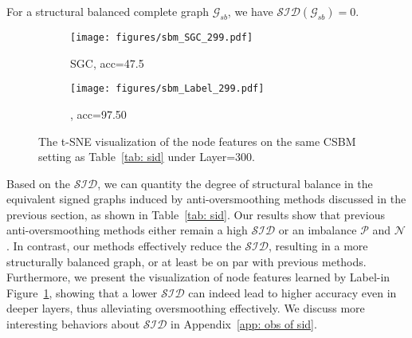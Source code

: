 \begin{proposition}
\label{pro: sid}
For a structural balanced complete graph $\mathcal{G}_{sb}$, we have $\mathcal{SID}(\mathcal{G}_{sb})=0$.
\end{proposition}
% 
\begin{figure}[t]
    \centering
    \begin{subfigure}{0.3\textwidth}
      \texttt{[image: figures/sbm\_SGC\_299.pdf]}
      \caption{SGC, acc=47.5}
    \end{subfigure}
    \quad
    \begin{subfigure}{0.3\textwidth}
      \texttt{[image: figures/sbm\_Label\_299.pdf]}
      \caption{\ours, acc=97.50}
    \end{subfigure}
    \caption{The t-SNE visualization of the node features on the same CSBM setting as Table~\ref{tab: sid} under Layer=300.}
    \label{fig: visual node}
\end{figure}


Based on the \(\mathcal{SID}\), we can quantity the degree of structural balance in the equivalent signed graphs induced by anti-oversmoothing methods discussed in the previous section, as shown in Table~\ref{tab: sid}. 
Our results show that previous anti-oversmoothing methods either remain a high $\mathcal{SID}$ or an imbalance $\mathcal{P}$ and $\mathcal{N}$. In contrast, our methods effectively reduce the $\mathcal{SID}$, resulting in a more structurally balanced graph, or at least be on par with previous methods.
Furthermore, we present the visualization of node features learned by Label-\ours in Figure~\ref{fig: visual node}, showing that a lower $\mathcal{SID}$ can indeed lead to higher accuracy even in deeper layers, thus alleviating oversmoothing effectively.
We discuss more interesting behaviors about $\mathcal{SID}$ in Appendix~\ref{app: obs of sid}.

